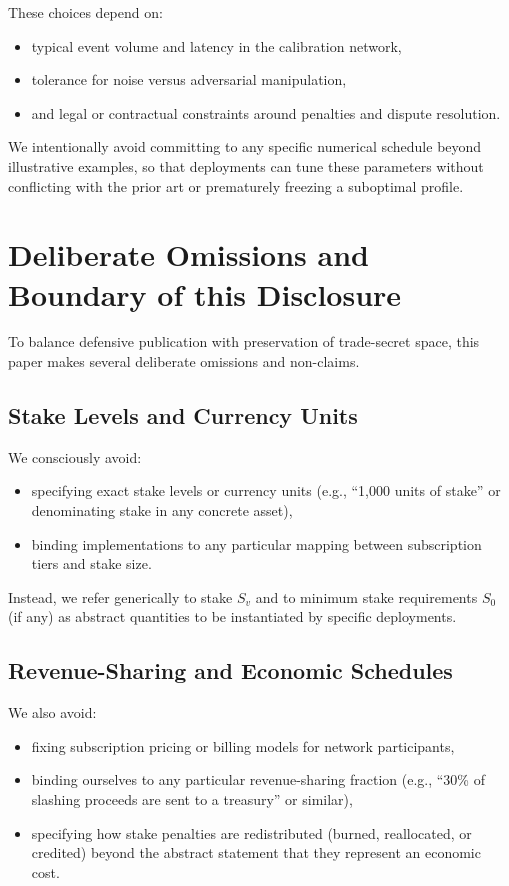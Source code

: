 \documentclass[11pt]{article}
\begin{document}
These choices depend on:
\begin{itemize}[leftmargin=*]
  \item typical event volume and latency in the calibration network,
  \item tolerance for noise versus adversarial manipulation,
  \item and legal or contractual constraints around penalties and dispute resolution.
\end{itemize}

We intentionally avoid committing to any specific numerical schedule beyond illustrative examples, so that deployments can tune these parameters without conflicting with the prior art or prematurely freezing a suboptimal profile.

\section{Deliberate Omissions and Boundary of this Disclosure}

To balance defensive publication with preservation of trade-secret space, this paper makes several deliberate omissions and non-claims.

\subsection{Stake Levels and Currency Units}

We consciously avoid:
\begin{itemize}[leftmargin=*]
  \item specifying exact stake levels or currency units (e.g., ``1{,}000 units of stake'' or denominating stake in any concrete asset),
  \item binding implementations to any particular mapping between subscription tiers and stake size.
\end{itemize}

Instead, we refer generically to stake \(S_v\) and to minimum stake requirements \(S_0\) (if any) as abstract quantities to be instantiated by specific deployments.

\subsection{Revenue-Sharing and Economic Schedules}

We also avoid:
\begin{itemize}[leftmargin=*]
  \item fixing subscription pricing or billing models for network participants,
  \item binding ourselves to any particular revenue-sharing fraction (e.g., ``30\% of slashing proceeds are sent to a treasury'' or similar),
  \item specifying how stake penalties are redistributed (burned, reallocated, or credited) beyond the abstract statement that they represent an economic cost.
\end{itemize}
\end{document}
